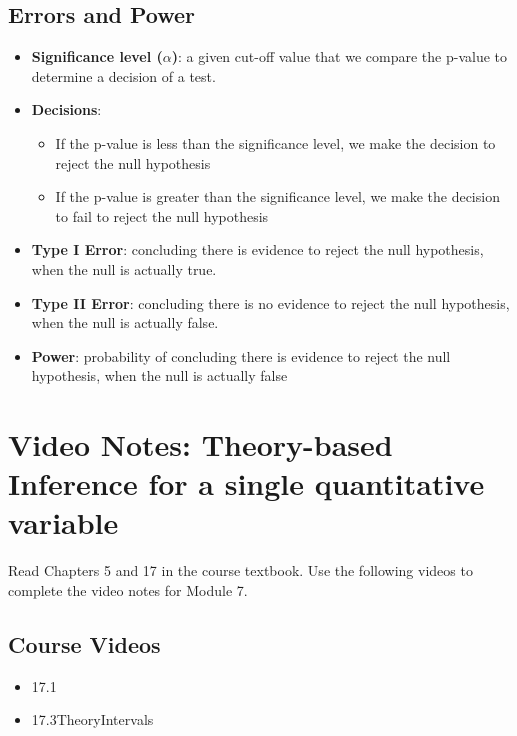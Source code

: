 \documentclass[
]{report}
\begin{document}
\newpage

\subsection*{Errors and Power}\label{errors-and-power}

\begin{itemize}
\item
  \textbf{Significance level (\(\alpha\))}: a given cut-off value that we compare the p-value to determine a decision of a test.
\item
  \textbf{Decisions}:

  \begin{itemize}
  \item
    If the p-value is less than the significance level, we make the decision to reject the null hypothesis
  \item
    If the p-value is greater than the significance level, we make the decision to fail to reject the null hypothesis
  \end{itemize}
\item
  \textbf{Type I Error}: concluding there is evidence to reject the null hypothesis, when the null is actually true.
\item
  \textbf{Type II Error}: concluding there is no evidence to reject the null hypothesis, when the null is actually false.
\item
  \textbf{Power}: probability of concluding there is evidence to reject the null hypothesis, when the null is actually false
\end{itemize}

\newpage

\section{Video Notes: Theory-based Inference for a single quantitative variable}\label{video-notes-theory-based-inference-for-a-single-quantitative-variable}

Read Chapters 5 and 17 in the course textbook. Use the following videos to complete the video notes for Module 7.

\subsection{Course Videos}\label{course-videos-1}

\begin{itemize}
\item
  17.1
\item
  17.3TheoryIntervals
\end{itemize}
\end{document}
